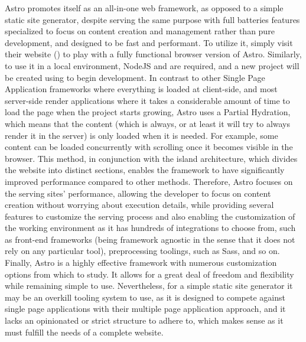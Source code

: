 \markdownRendererDocumentBegin
{}\markdownRendererInterblockSeparator
{}Astro promotes itself as an all-in-one web framework, as opposed to a simple static site generator, despite serving the same purpose with full batteries features specialized to focus on content creation and management rather than pure development, and designed to be fast and performant.\markdownRendererInterblockSeparator
{}To utilize it, simply visit their website () to play with a fully functional browser version of Astro. Similarly, to use it in a local environment, NodeJS and  are required, and a new project will be created using  to begin development.\markdownRendererInterblockSeparator
{}In contrast to other Single Page Application frameworks where everything is loaded at client-side, and most server-side render applications where it takes a considerable amount of time to load the page when the project starts growing, Astro uses a Partial Hydration, which means that the content (which is always, or at least it will try to always render it in the server) is only loaded when it is needed. For example, some content can be loaded concurrently with scrolling once it becomes visible in the browser.\markdownRendererInterblockSeparator
{}This method, in conjunction with the island architecture, which divides the website into distinct sections, enables the framework to have significantly improved performance compared to other methods.\markdownRendererInterblockSeparator
{}Therefore, Astro focuses on the serving sites' performance, allowing the developer to focus on content creation without worrying about execution details, while providing several features to customize the serving process and also enabling the customization of the working environment as it has hundreds of integrations to choose from, such as front-end frameworks (being framework agnostic in the sense that it does not rely on any particular tool), preprocessing toolings, such as Sass, and so on.\markdownRendererInterblockSeparator
{}Finally, Astro is a highly effective framework with numerous customization options from which to study. It allows for a great deal of freedom and flexibility while remaining simple to use. Nevertheless, for a simple static site generator it may be an overkill tooling system to use, as it is designed to compete against single page applications with their multiple page application approach, and it lacks an opinionated or strict structure to adhere to, which makes sense as it must fulfill the needs of a complete website.\markdownRendererDocumentEnd